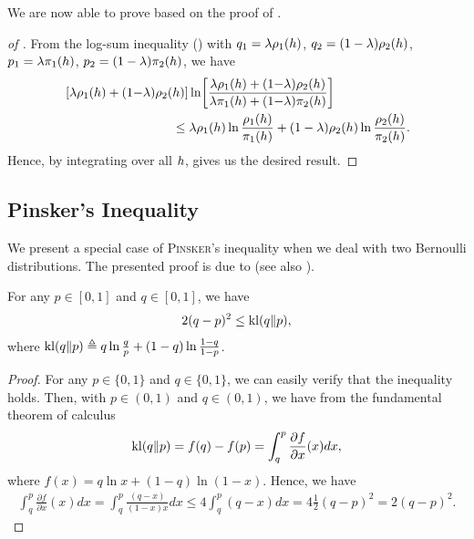 \begin{noaddcontents}
We are now able to prove  based on the proof of \citet[Theorem 2.7.2]{CoverThomas2006}.


\begin{proof}[of ]
From the log-sum inequality () with $q_1=\lambda\rho_1(h)$, $q_2=(1-\lambda)\rho_2(h)$, $p_1=\lambda\pi_1(h)$, $p_2=(1-\lambda)\pi_2(h)$, we have
\begin{align*}
\hspace{-3cm}&\LB\lambda\Q_1(\h) + (1{-}\lambda)\Q_2(\h)\RB\ln\!\LB \frac{\lambda\Q_1(\h) + (1{-}\lambda)\Q_2(\h)}{\lambda\P_1(\h) + (1{-}\lambda)\P_2(\h)}\RB\\ 
&\hspace{3cm}\le \lambda\Q_1(\h)\ln\frac{\Q_1(\h)}{\P_1(\h)} + (1-\lambda)\Q_2(\h)\ln\frac{\Q_2(\h)}{\P_2(\h)}.
\end{align*}
Hence, by integrating over all $h$, gives us the desired result.
\end{proof}

\subsection{Pinsker's Inequality}

We present a special case of \textsc{Pinsker}'s inequality when we deal with two Bernoulli distributions.
The presented proof is due to \citet{Wu2020} (see also \citet{Canonne2022}).

\begin{theorem}
For any $p\in[0,1]$ and $q\in[0,1]$, we have
\begin{align*}
    2(q-p)^2 \le \operatorname{kl}(q\|p),
\end{align*}
where $\operatorname{kl}(q\|p) \triangleq q\ln\frac{q}{p}+(1-q)\ln\frac{1-q}{1-p}$.
\label{ap:pac-bayes:theorem:pinsker}
\end{theorem}
\begin{proof}
For any $p\in\{0,1\}$ and $q\in\{0,1\}$, we can easily verify that the inequality holds.
Then, with $p\in(0,1)$ and $q\in(0,1)$, we have from the fundamental theorem of calculus
\begin{align*}
    \operatorname{kl}(q\|p) = f(q)-f(p) = \int_{q}^{p}\frac{\partial f}{\partial x}(x) dx,
\end{align*}
where $f(x)=q\ln x+(1-q)\ln(1-x)$.
Hence, we have 
\begin{align*}
    \int_{q}^{p}\frac{\partial f}{\partial x}(x) dx = \int_{q}^{p} \frac{(q-x)}{(1-x)x} dx \le 4\int_{q}^{p} (q-x)dx=4\frac{1}{2}(q-p)^2 = 2(q-p)^2.
\end{align*}
\end{proof}



\end{noaddcontents}
